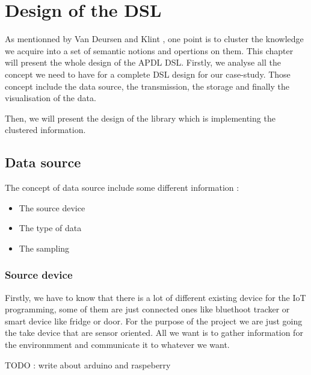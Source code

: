 \chapter{Design of the DSL}
\label{cha:dsl-design}

As mentionned by Van Deursen and Klint
\cite{little_languages_little_maintenance}, one point is to cluster the
knowledge we acquire into a set of semantic notions and opertions on them. This
chapter will present the whole design of the APDL DSL. Firstly, we analyse all
the concept we need to have for a complete DSL design for our case-study. Those
concept include the data source, the transmission, the storage and finally the
visualisation of the data.

Then, we will present the design of the library which is implementing the
clustered information.

\section{Data source}
\label{sec:dsl-design-data-source}

The concept of data source include some different information :
\begin{itemize}
\item The source device
\item The type of data
\item The sampling
\end{itemize}

\subsection{Source device}
\label{subsec:dsl-design-source-device}

Firstly, we have to know that there is a lot of different existing device for
the IoT programming, some of them are just connected ones like bluethoot tracker
or smart device like fridge or door. For the purpose of the project we are just
going the take device that are sensor oriented. All we want is to gather
information for the environmment and communicate it to whatever we want.

TODO : write about arduino and raspeberry

